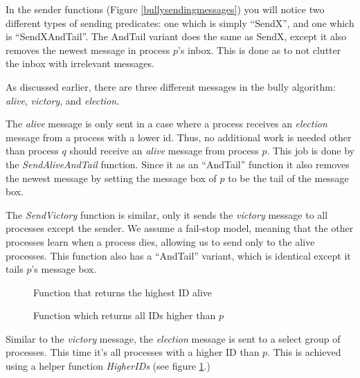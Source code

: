 \documentclass{report}
\begin{document}
In the sender functions (Figure \ref{bullysendingmessages}) you will notice two different types of sending predicates: one which is simply ``SendX'', and one which is ``SendXAndTail''. The AndTail variant does the same as SendX, except it also removes the newest message in process $p$'s inbox. This is done as to not clutter the inbox with irrelevant messages.

As discussed earlier, there are three different messages in the bully algorithm: \textit{alive}, \textit{victory}, and \textit{election}.

The \textit{alive} message is only sent in a case where a process receives an \textit{election} message from a process with a lower id. Thus, no additional work is needed other than process $q$ should receive an \textit{alive} message from process $p$. This job is done by the \textit{SendAliveAndTail} function. Since it as an ``AndTail'' function it also removes the newest message by setting the message box of $p$ to be the tail of the message box.

The \textit{SendVictory} function is similar, only it sends the \textit{victory} message to all processes except the sender. We assume a fail-stop model, meaning that the other processes learn when a process dies, allowing us to send only to the alive processes. This function also has a ``AndTail'' variant, which is identical except it tails $p$'s message box.

\begin{figure}

\tlatex
\@x{}\moduleLeftDash{}\moduleRightDash\@xx{}%
\@xx{}%
%
%
\fl{}\bottombar\cl{}

  \caption{Function that returns the highest ID alive}
  \end{figure}

\begin{figure}
  \tlatex

\@x{}\moduleLeftDash{}\moduleRightDash\@xx{}%
\fl{}\bottombar\cl{}
\label{higherids}
  \caption{Function which returns all IDs higher than $p$}
\end{figure}

Similar to the \textit{victory} message, the \textit{election} message is sent to a select group of processes. This time it's all processes with a higher ID than $p$. This is achieved using a helper function \textit{HigherIDs} (see figure \ref{higherids}.)
\end{document}
